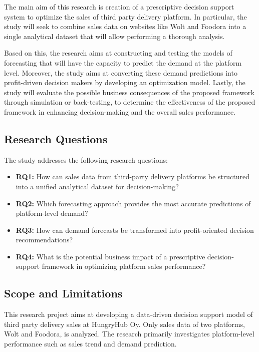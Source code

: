 The main aim of this research is creation of a prescriptive decision support system to optimize the sales of third party delivery platform. In particular, the study will seek to combine sales data on websites like Wolt and Foodora into a single analytical dataset that will allow performing a thorough analysis. 

Based on this, the research aims at constructing and testing the models of forecasting that will have the capacity to predict the demand at the platform level. Moreover, the study aims at converting these demand predictions into profit-driven decision makers by developing an optimization model. Lastly, the study will evaluate the possible business consequences of the proposed framework through simulation or back-testing, to determine the effectiveness of the proposed framework in enhancing decision-making and the overall sales performance.

\subsection{Research Questions}

The study addresses the following research questions:

\begin{itemize}
    \item \textbf{RQ1:} How can sales data from third-party delivery platforms be structured into a unified analytical dataset for decision-making?
    
    \item \textbf{RQ2:} Which forecasting approach provides the most accurate predictions of platform-level demand?
    
    \item \textbf{RQ3:} How can demand forecasts be transformed into profit-oriented decision recommendations?
    
    \item \textbf{RQ4:} What is the potential business impact of a prescriptive decision-support framework in optimizing platform sales performance?
\end{itemize}

\subsection{Scope and Limitations}

This research project aims at developing a data-driven decision support model of third party delivery sales at HungryHub Oy. Only sales data of two platforms, Wolt and Foodora, is analyzed. The research primarily investigates platform-level performance such as sales trend and demand prediction.

